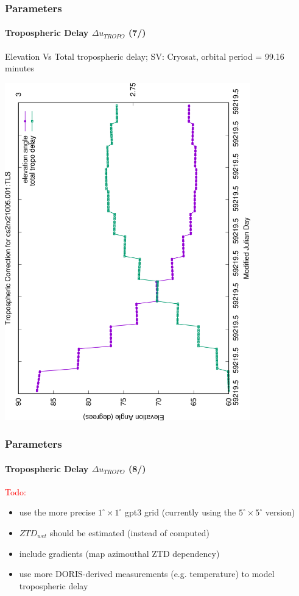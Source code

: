 \documentclass{beamer}
\newcommand{\bitem}{\item[\textbullet]}
\begin{document}
\begin{frame}\frametitle{Parameters}\framesubtitle{Tropospheric Delay \(\Delta u_{TROPO}\) (7/)}
  Elevation Vs Total tropospheric delay; SV: Cryosat, orbital period = 99.16 minutes
  \begin{center}
  \includegraphics[angle=-90, width=0.8\textwidth]{cs2rx21005.001-tropo-correction}
  \end{center}
\end{frame}

\begin{frame}\frametitle{Parameters}\framesubtitle{Tropospheric Delay \(\Delta u_{TROPO}\) (8/)}
  \textcolor{red}{Todo:}
  \begin{itemize}
    \bitem use the more precise \(1^\circ \times 1^\circ \) gpt3 grid (currently using the \(5^\circ \times 5^\circ \) version)
    \bitem \(ZTD_{wet}\) should be estimated (instead of computed)
    \bitem include gradients (map azimouthal ZTD dependency)
    \bitem use more DORIS-derived measurements (e.g. temperature) to model tropospheric delay
  \end{itemize}
\end{frame}
\end{document}

